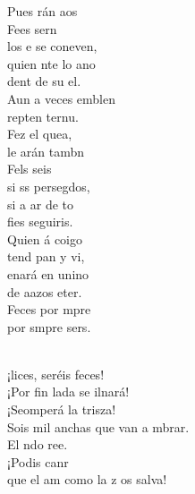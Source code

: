 \documentclass[12pt]{article}
\begin{document}
\begin{multicols*}{2}
\begin{cancion}
	Pues rán aos\\
	Fees sern\\
	los e se coneven,\\
	quien nte lo ano\\
	dent de su el.\\
	Aun a veces emblen\\
	repten ternu.\\
	Fez el quea,\\
	le arán tambn\\
	Fels seis \\
	si ss persegdos,\\
	si a ar de to\\
	fies seguiris.\\
	Quien á coigo\\
	tend pan y vi,  \\
	enará en unino\\
	de aazos eter.\\
	Feces por mpre\\
	por smpre sers.\\\jump\\
	\begin{chorus}%
	¡lices, seréis feces! \\
	¡Por fin lada se ilnará!\\
	¡Seomperá la trisza!\\
	Sois mil anchas que van a mbrar.\\
	El ndo ree.\\
	¡Podis canr\\
	que el am como la z os salva!\\
	\end{chorus}%

\end{cancion}
\end{multicols*}
\end{document}
